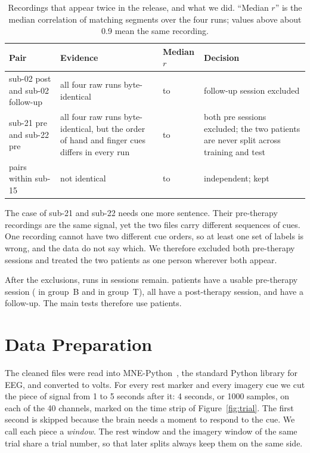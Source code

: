 \begin{table}[tbp]
  \centering
  \caption[Recordings that appear twice in the release, and what we did]{Recordings that appear twice in the release, and what we did. ``Median $r$'' is
  the median correlation of matching segments over the four runs; values above about
  0.9 mean the same recording.}
  \label{tab:audit}
  \small
  \begin{tabularx}{\textwidth}{@{}>{\raggedright\arraybackslash}p{3.3cm}>{\raggedright\arraybackslash}X>{\raggedright\arraybackslash}p{2.1cm}>{\raggedright\arraybackslash}X@{}}
    \toprule
    Pair & Evidence & Median $r$ & Decision \\
    \midrule
    sub-02 post and sub-02 follow-up & all four raw runs byte-identical & \auditFollowCopyCorrMin{} to \auditFollowCopyCorrMax{} & follow-up session excluded \\
    sub-21 pre and sub-22 pre & all four raw runs byte-identical, but the order of hand and finger cues differs in every run & \auditSharedPreCorrMin{} to \auditSharedPreCorrMax{} & both pre sessions excluded; the two patients are never split across training and test \\
    \auditIndependentPairs{} pairs within sub-15 & not identical & \auditIndependentCorrMin{} to \auditIndependentCorrMax{} & independent; kept \\
    \bottomrule
  \end{tabularx}
\end{table}

The case of sub-21 and sub-22 needs one more sentence. Their pre-therapy recordings are
the same signal, yet the two files carry different sequences of cues. One recording
cannot have two different cue orders, so at least one set of labels is wrong, and the
data do not say which. We therefore excluded both pre-therapy sessions and treated the
two patients as one person wherever both appear.

After the exclusions, \nRunsKept{} runs in \nSessionsKept{} sessions remain.
\nPre{} patients have a usable pre-therapy session (\nPreGroupB{} in group~B and
\nPreGroupT{} in group~T), all \nPost{} have a post-therapy session, and \nFollow{} have a
follow-up. The main tests therefore use \nPre{} patients.

\section{Data Preparation}\label{sec:prep}

The cleaned files were read into MNE-Python~\cite{gramfort2013}, the standard Python
library for EEG, and converted to volts. For every rest marker and every imagery cue we
cut the piece of signal from 1 to 5 seconds after it: 4 seconds, or 1000 samples, on each
of the 40 channels, marked on the time strip of Figure~\ref{fig:trial}. The first second
is skipped because the brain needs a moment to respond to the cue. We call each piece a
\emph{window}. The rest window and the imagery window of the same trial share a trial
number, so that later splits always keep them on the same side.


